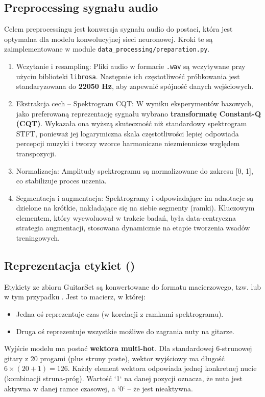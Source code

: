 \subsection*{Preprocessing sygnału audio}

Celem preprocessingu jest konwersja sygnału audio do postaci, która jest optymalna dla modelu konwolucyjnej sieci neuronowej. Kroki te są zaimplementowane w module \texttt{data\_processing/preparation.py}.

\begin{enumerate}
    \item Wczytanie i resampling: Pliki audio w formacie \texttt{.wav} są wczytywane przy użyciu biblioteki \texttt{librosa}. Następnie ich częstotliwość próbkowania jest standaryzowana do \textbf{22050 Hz}, aby zapewnić spójność danych wejściowych.
    \item Ekstrakcja cech – Spektrogram CQT: W wyniku eksperymentów bazowych, jako preferowaną reprezentację sygnału wybrano \textbf{transformatę Constant-Q (CQT)}. Wykazała ona wyższą skuteczność niż standardowy spektrogram STFT, ponieważ jej logarymiczna skala częstotliwości lepiej odpowiada percepcji muzyki i tworzy wzorce harmoniczne niezmiennicze względem transpozycji.
    \item Normalizacja: Amplitudy spektrogramu są normalizowane do zakresu [0, 1], co stabilizuje proces uczenia.
    \item Segmentacja i augmentacja: Spektrogramy i odpowiadające im adnotacje są dzielone na krótkie, nakładające się na siebie segmenty (ramki). Kluczowym elementem, który wyewoluował w trakcie badań, była data-centryczna strategia augmentacji, stosowana dynamicznie na etapie tworzenia wsadów treningowych.
\end{enumerate}

\subsection*{Reprezentacja etykiet ()}

Etykiety ze zbioru GuitarSet są konwertowane do formatu macierzowego, tzw.  lub w tym przypadku . Jest to macierz, w której:
\begin{itemize}
    \item Jedna oś reprezentuje czas (w korelacji z ramkami spektrogramu).
    \item Druga oś reprezentuje wszystkie możliwe do zagrania nuty na gitarze.
\end{itemize}
Wyjście modelu ma postać \textbf{wektora multi-hot}. Dla standardowej 6-strunowej gitary z 20 progami (plus struny puste), wektor wyjściowy ma długość $6 \times (20 + 1) = 126$. Każdy element wektora odpowiada jednej konkretnej nucie (kombinacji struna-próg). Wartość `1` na danej pozycji oznacza, że nuta jest aktywna w danej ramce czasowej, a `0` – że jest nieaktywna.

